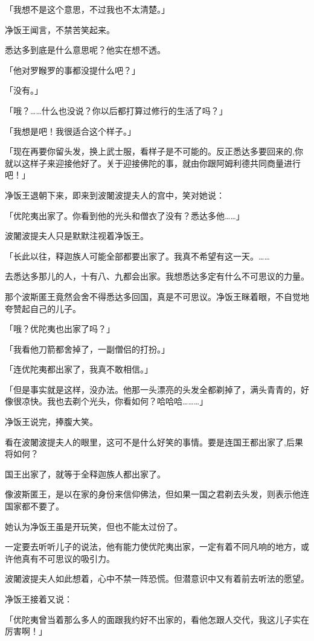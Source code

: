 \documentclass[twoside,openany]{book}
\begin{document}
「我想不是这个意思，不过我也不太清楚。」

净饭王闻言，不禁苦笑起来。

悉达多到底是什么意思呢？他实在想不透。

「他对罗睺罗的事都没提什么吧？」

「没有。」

「哦？……什么也没说？你以后都打算过修行的生活了吗？」

「我想是吧！我很适合这个样子。」

「现在再要你留头发，换上武士服，看样子是不可能的。反正悉达多要回来的,你就以这样子来迎接他好了。关于迎接佛陀的事，就由你跟阿姆利德共同商量进行吧！」

净饭王退朝下来，即来到波闍波提夫人的宫中，笑对她说：

「优陀夷出家了。你看到他的光头和僧衣了没有？悉达多他……」

波闍波提夫人只是默默注视着净饭王。

「长此以往，释迦族人可能全部都要出家了。我真不希望有这一天。……

去悉达多那儿的人，十有八、九都会出家。我想悉达多定有什么不可思议的力量。

那个波斯匿王竟然会舍不得悉达多回国，真是不可思议。净饭王眯着眼，不自觉地夸赞起自己的儿子。

「哦？优陀夷也出家了吗？」

「我看他刀箭都舍掉了，一副僧侣的打扮。」

「连优陀夷都出家了，我真不敢相信。」

「但是事实就是这样，没办法。他那一头漂亮的头发全都剃掉了，满头青青的，好像很凉快。我也去剃个光头，你看如何？哈哈哈………」

净饭王说完，捧腹大笑。

看在波闍波提夫人的眼里，这可不是什么好笑的事情。要是连国王都出家了,后果将如何？

国王出家了，就等于全释迦族人都出家了。

像波斯匿王，是以在家的身份来信仰佛法，但如果一国之君剃去头发，则表示他连国家都不要了。

她认为净饭王虽是开玩笑，但也不能太过份了。

一定要去听听儿子的说法，他有能力使优陀夷出家，一定有着不同凡响的地方，或许他真有不可思议的吸引力。

波闍波提夫人如此想着，心中不禁一阵恐慌。但潜意识中又有着前去听法的愿望。

净饭王接着又说：

「优陀夷曾当着那么多人的面跟我约好不出家的，看他怎跟人交代，我这儿子实在厉害啊！」
\end{document}
